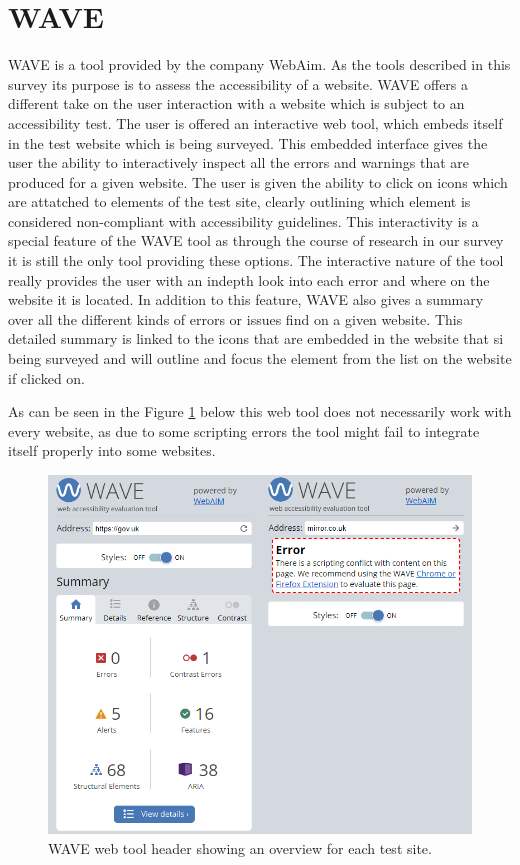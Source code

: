 \section{WAVE}

WAVE \parencite{WAVE_web} is a tool provided by the company WebAim. As
the tools described in this survey its purpose is to assess the
accessibility of a website. WAVE offers a different take on the user
interaction with a website which is subject to an accessibility
test. The user is offered an interactive web tool, which embeds itself
in the test website which is being surveyed.  This embedded interface
gives the user the ability to interactively inspect all the errors and
warnings that are produced for a given website. The user is given the
ability to click on icons which are attatched to elements of the test
site, clearly outlining which element is considered non-compliant with
accessibility guidelines. This interactivity is a special feature of
the WAVE tool as through the course of research in our survey it is
still the only tool providing these options. The interactive nature of
the tool really provides the user with an indepth look into each error
and where on the website it is located. In addition to this feature,
WAVE also gives a summary over all the different kinds of errors or
issues find on a given website. This detailed summary is linked to the
icons that are embedded in the website that si being surveyed and will
outline and focus the element from the list on the website if clicked
on.

As can be seen in the Figure \ref{fig:WAVE} below this web tool does
not necessarily work with every website, as due to some scripting
errors the tool might fail to integrate itself properly into some
websites.


\begin{figure}[h!]
\centering
\includegraphics[keepaspectratio,width=\linewidth,height=\halfh]
{images/WAVE.png}

\caption[Accessi Overview]
{%
WAVE web tool header showing an overview for each test site.
}
\label{fig:WAVE}
\end{figure}






